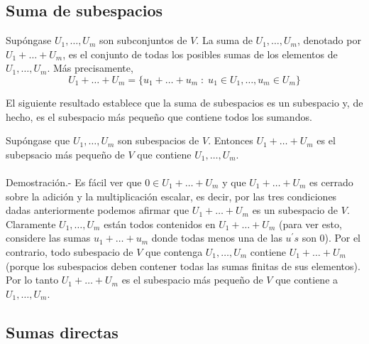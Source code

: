 \subsection{Suma de subespacios}

\begin{tcolorbox}[colback=white]
    \begin{def.}
	Supóngase $U_1,\ldots ,U_m$ son subconjuntos de $V$. La suma de $U_1,\ldots, U_m$, denotado por $U_1 + \ldots+U_m$, es el conjunto de todas los posibles  sumas de los elementos de $U_1,\ldots,U_m$. Más precisamente,
	$$U_1+\ldots+U_m = \lbrace u_1+\ldots +u_m\; :\; u_1\in U_1,\ldots, u_m \in U_m \rbrace$$
    \end{def.}
\end{tcolorbox}
\vspace{.5cm}

El siguiente resultado establece que la suma de subespacios es un subespacio y, de hecho, es el subespacio más pequeño que contiene todos los sumandos.

\begin{teo} \hfill

    Supóngase que $U_1,\ldots,U_m$ son subespacios de $V$. Entonces $U_1+\ldots +U_m$ es el subepsacio más pequeño de $V$ que contiene $U_1,\ldots, U_m$.\\\\
	Demostración.-\; Es fácil ver que $0\in U_1+\ldots + U_m$ y que $U_1+\ldots +U_m$ es cerrado sobre la adición y la multiplicación escalar, es decir, por las tres condiciones dadas anteriormente podemos afirmar que $U_1+\ldots + U_m$ es un subespacio de $V$.\\
	Claramente $U_1,\ldots, U_m$ están todos contenidos en $U_1 + \ldots + U_m$ (para ver esto, considere las sumas $u_1+\ldots + u_m$ donde todas menos una de las $u^{'}s$ son $0$). Por el contrario, todo subespacio de $V$ que contenga $U_1,\ldots , U_m$ contiene $U_1 + \ldots + U_m$ (porque los subespacios deben contener todas las sumas finitas de sus elementos). Por lo tanto $U_1+\ldots + U_m$ es el subespacio más pequeño de $V$ que contiene a $U_1,\ldots , U_m$.
\end{teo}

\subsection{Sumas directas}


